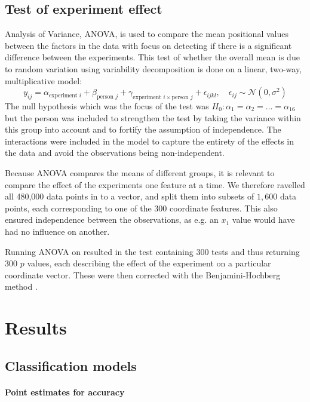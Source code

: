 \documentclass[11pt,fleqn]{article}
\begin{document}
\subsection{Test of experiment effect}\label{subsec:expeffect}
Analysis of Variance, ANOVA, is used to compare the mean positional values between the factors in the data with focus on detecting if there is a significant difference between the experiments.
This test of whether the overall mean is due to random variation using variability decomposition is done on a linear, two-way, multiplicative model:
\[
	y_{ij} = \alpha_{\text{experiment } i}+
	\beta_{\text{person } j}+ 
	\gamma_{\text{experiment } i \times\text{person } j }
	+ \epsilon_{ijkl}, \quad \epsilon_{ij} \sim \mathcal N (0, \sigma^2)
\]
The null hypothesis which was the focus of the test was $ H_0: \alpha_1=\alpha_2=\ldots=\alpha_{16} $ but the person was included to strengthen the test by taking the variance within this group into account and to fortify the assumption of independence. 
The interactions were included in the model to capture the entirety of the effects in the data and avoid the observations being non-independent.

Because ANOVA compares the means of different groups, it is relevant to compare the effect of the experiments one feature at a time.
We therefore ravelled all 480,000 data points in to a vector, and split them into subsets of $ 1,600 $ data points, each corresponding to one of the $ 300 $ coordinate features.
This also ensured independence between the observations, as e.g. an $ x_1 $ value would have had no influence on another.

Running ANOVA on resulted in the test containing 300 tests and thus returning 300 $ p $ values, each describing the effect of the experiment on a particular coordinate vector. These were then corrected with the Benjamini-Hochberg method \cite{BH}.


\section{Results}

\subsection{Classification models}

\paragraph{Point estimates for accuracy}
\end{document}
